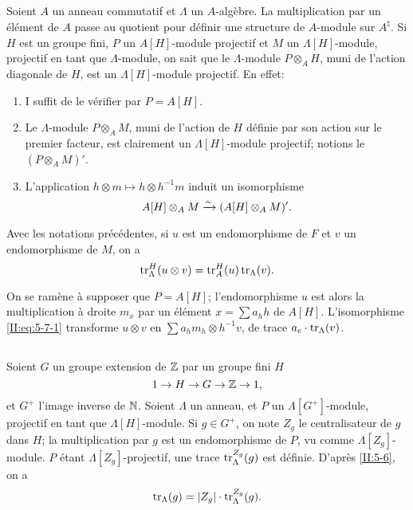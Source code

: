\documentclass[oneside]{book}
\begin{document}
\subsection{}\label{II:5-7}

Soient $A$ un anneau commutatif et $\Lambda$ un $A$-alg\`ebre. La multiplication 
par un \'el\'ement de $A$ passe au quotient pour d\'efinir une structure de 
$A$-module sur $A^\natural$. Si $H$ est un groupe fini, $P$ un $A[H]$-module 
projectif et $M$ un $\Lambda[H]$-module, projectif en tant que $\Lambda$-module, 
on sait que le $\Lambda$-module $P\otimes_A H$, muni de l'action diagonale de 
$H$, est un $\Lambda[H]$-module projectif. En effet: 
\begin{enumerate}[\indent a)]
  \item I suffit de le v\'erifier par $P=A[H]$. 
  \item Le $\Lambda$-module $P\otimes_A M$, muni de l'action de $H$ d\'efinie 
    par son action sur le premier facteur, est clairement un 
    $\Lambda[H]$-module projectif; notions le $(P\otimes_A M)'$. 
  \item L'application $h\otimes m\mapsto h\otimes h^{-1} m$ induit un 
    isomorphisme 
    \begin{equation}\label{II:eq:5-7-1}
      A[H]\otimes_A M \xrightarrow\sim (A[H]\otimes_A M)' \text{.}
    \end{equation}
\end{enumerate}





\begin{proposition_}\label{II:5-8}
Avec les notations pr\'ec\'edentes, si $u$ est un endomorphisme de $F$ et 
$v$ un endomorphisme de $M$, on a 
\[
  \operatorname{tr}_\Lambda^H(u\otimes v) = \operatorname{tr}_A^H(u)\operatorname{tr}_\Lambda(v) \text{.}
\]
\end{proposition_}

On se ram\`ene \`a supposer que $P=A[H]$; l'endomorphisme $u$ est alors la 
multiplication \`a droite $m_x$ par un \'el\'ement $x=\sum a_h h$ de $A[H]$. 
L'isomorphisme \eqref{II:eq:5-7-1} transforme $u\otimes v$ en 
$\sum a_h m_h\otimes h^{-1} v$, de trace $a_e\cdot\operatorname{tr}_\Lambda(v)$. 





\subsection{}\label{II:5-9}

Soient $G$ un groupe extension de $\mathbb{Z}$ par un groupe fini $H$
\[
  1 \to H \to G \to \mathbb{Z} \to 1 \text{,}
\]
et $G^+$ l'image inverse de $\mathbb{N}$. Soient $\Lambda$ un anneau, et $P$ un 
$\Lambda[G^+]$-module, projectif en tant que $\Lambda[H]$-module. Si 
$g\in G^+$, on note $Z_g$ le centralisateur de $g$ dans $H$; la multiplication 
par $g$ est un endomorphisme de $P$, vu comme $\Lambda[Z_g]$-module. $P$ \'etant 
$\Lambda[Z_g]$-projectif, une trace $\operatorname{tr}_\Lambda^{Z_g}(g)$ est d\'efinie. 
D'apr\`es \ref{II:5-6}, on a 
\begin{equation}\label{II:eq:5-9-1}
  \operatorname{tr}_\Lambda(g) = |Z_g| \cdot \operatorname{tr}_\Lambda^{Z_g}(g) \text{.}
\end{equation}
\end{document}
